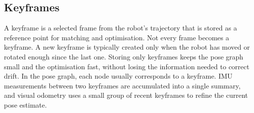 %

\subsection{Keyframes}


A keyframe is a selected frame from the robot's trajectory that is stored as
a reference point for matching and optimisation.
Not every frame becomes a keyframe. A new keyframe is typically created only
when the robot has moved or rotated enough since the last one.
Storing only keyframes keeps the pose graph small and the optimisation fast,
without losing the information needed to correct drift.
In the pose graph, each node usually corresponds to a keyframe.
IMU measurements between two keyframes are accumulated into a single summary,
and visual odometry uses a small group of recent keyframes to refine the
current pose estimate.

